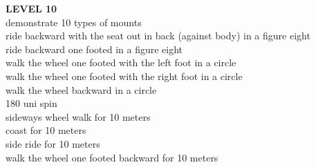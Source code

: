 \textbf{LEVEL 10}\\
demonstrate 10 types of mounts\\
ride backward with the seat out in back (against body) in a figure eight\\
ride backward one footed in a figure eight\\
walk the wheel one footed with the left foot in a circle\\
walk the wheel one footed with the right foot in a circle\\
walk the wheel backward in a circle\\
180 uni spin\\
sideways wheel walk for 10 meters\\
coast for 10 meters\\
side ride for 10 meters\\
walk the wheel one footed backward for 10 meters\\
 

